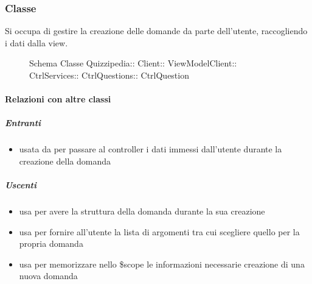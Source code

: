 \subsubsection{Classe }
Si occupa di gestire la creazione delle domande da parte dell'utente, raccogliendo i dati dalla view.
\begin{figure}[H]
\centering
\noindent{}
\caption[Schema Classe CtrlQuestion]{Schema Classe Quizzipedia:: Client:: ViewModelClient:: CtrlServices:: CtrlQuestions:: CtrlQuestion}
\end{figure}
\paragraph{Relazioni con altre classi}
\subparagraph{Entranti}
\begin{itemize}
\item usata da  per passare al controller i dati immessi dall'utente durante la creazione della domanda
\end{itemize}
\subparagraph{Uscenti}
\begin{itemize}
\item usa  per avere la struttura della domanda durante la sua creazione
\item usa  per fornire all'utente la lista di argomenti tra cui scegliere quello per la propria domanda
\item usa  per memorizzare nello \$scope le informazioni necessarie creazione di una nuova domanda
\end{itemize}
